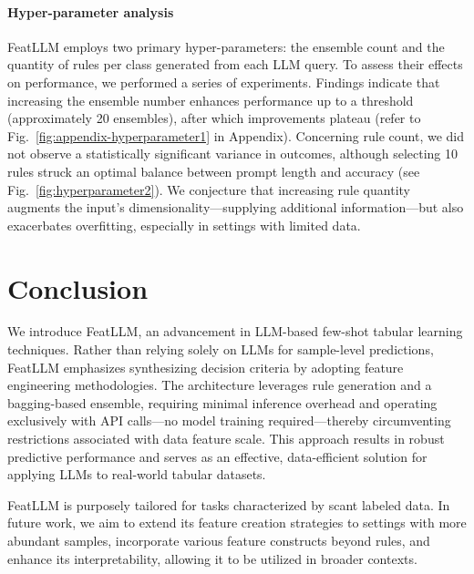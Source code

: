 \vspace*{-0.12in}
\paragraph{Hyper-parameter analysis}
\textsf{FeatLLM} employs two primary hyper-parameters: the ensemble count and the quantity of rules per class generated from each LLM query. To assess their effects on performance, we performed a series of experiments. Findings indicate that increasing the ensemble number enhances performance up to a threshold (approximately 20 ensembles), after which improvements plateau (refer to Fig.~\ref{fig:appendix-hyperparameter1} in Appendix). Concerning rule count, we did not observe a statistically significant variance in outcomes, although selecting 10 rules struck an optimal balance between prompt length and accuracy (see Fig.~\ref{fig:hyperparameter2}). We conjecture that increasing rule quantity augments the input’s dimensionality—supplying additional information—but also exacerbates overfitting, especially in settings with limited data.

\section{Conclusion}
We introduce \textsf{FeatLLM}, an advancement in LLM-based few-shot tabular learning techniques. Rather than relying solely on LLMs for sample-level predictions, \textsf{FeatLLM} emphasizes synthesizing decision criteria by adopting feature engineering methodologies. The architecture leverages rule generation and a bagging-based ensemble, requiring minimal inference overhead and operating exclusively with API calls—no model training required—thereby circumventing restrictions associated with data feature scale. This approach results in robust predictive performance and serves as an effective, data-efficient solution for applying LLMs to real-world tabular datasets.

\textsf{FeatLLM} is purposely tailored for tasks characterized by scant labeled data. In future work, we aim to extend its feature creation strategies to settings with more abundant samples, incorporate various feature constructs beyond rules, and enhance its interpretability, allowing it to be utilized in broader contexts.

